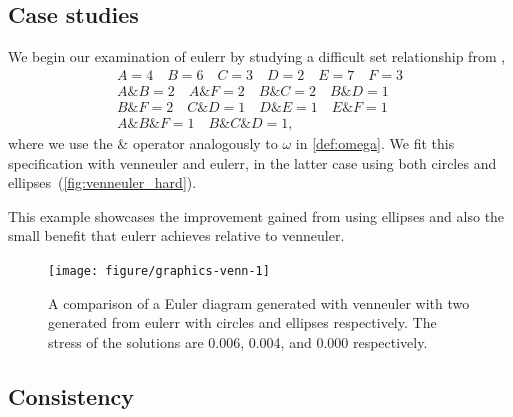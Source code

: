 \documentclass[a4paper,nofonts,nobib,titlepage,justified,marginals=raggedouter,nohyper]{tufte-handout}\usepackage[]{graphicx}\usepackage[]{color}
\newenvironment{knitrout}{}{} %
\newcommand{\pkg}[1]{{\fontseries{b}\selectfont #1}}
\begin{document}
\subsection{Case studies}
\label{sec:caseStudies}

We begin our examination of \pkg{eulerr} by studying a difficult set relationship
from \citet{wilkinson_2012},
\begin{gather*}
A = 4 \quad B = 6 \quad C = 3 \quad D = 2 \quad E = 7 \quad F = 3\\
A\& B = 2 \quad A\&F = 2 \quad B\& C = 2 \quad B\&D = 1 \\
B\& F = 2 \quad C\&D = 1 \quad D\& E = 1 \quad E\&F = 1 \\
A\&B\&F = 1 \quad B\&C\&D = 1,\end{gather*}
where we use the $\&$ operator analogously to $\omega$ in \cref{def:omega}. We
fit this specification with \pkg{venneuler} and \pkg{eulerr}, in the latter
case using both circles and ellipses~(\cref{fig:venneuler_hard}).

This example showcases the improvement gained from using ellipses and also the
small benefit that \pkg{eulerr} achieves relative to \pkg{venneuler}.

\begin{figure}[hbtp!]%
\begin{knitrout}
\color{fgcolor}

{\centering \texttt{[image: figure/graphics-venn-1]} 

}



\end{knitrout}
\label{fig:venneulerHard}
\caption{A comparison of a Euler diagram generated with \pkg{venneuler} with two generated from \pkg{eulerr} with circles and ellipses respectively. The stress of the solutions are 0.006, 0.004, and 0.000 respectively.}
\end{figure}

\subsection{Consistency}
\label{sec:consistency}
\end{document}
